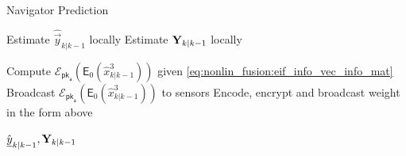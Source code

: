 \begin{algorithm}[htbp]
\caption{Navigator Prediction}\label{alg:nonlin_fusion:nav_prediction}
\begin{algorithmic}[1]
    \State Estimate $\hat{\vec{y}}_{k|k-1}$ locally
    \State Estimate ${{\mathbf{Y}}}_{k|k-1}$ locally

    \State Compute $\mathcal{E}_{\mathsf{pk}_{\mathsf{a}}}\left(\mathsf{E}_{0}\left(\hat{x}^3_{k|k-1}\right)\right)$ given \eqref{eq:nonlin_fusion:eif_info_vec_info_mat}
    \State Broadcast $\mathcal{E}_{\mathsf{pk}_{\mathsf{a}}}\left(\mathsf{E}_{0}\left(\hat{x}^3_{k|k-1}\right)\right)$ to sensors
        \State Encode, encrypt and broadcast weight in the form above
    \EndFor

    \State \Return $\hat{{\underline{y}}}_{k|k-1}, {{\mathbf{Y}}}_{k|k-1}$
    \EndProcedure
\end{algorithmic}
\end{algorithm}

